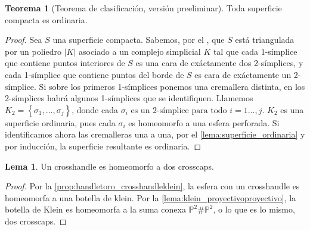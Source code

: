 \documentclass[10pt]{report}
\newcommand{\Proyectivo}{\mathbb{P}^2}
\theoremstyle{definition}
\newtheorem{tma}[defin]{Teorema}
\newtheorem{lema}[defin]{Lema}
\begin{document}
\begin{tma}[Teorema de clasificación, versión preeliminar] %
Toda superficie compacta es ordinaria.
\end{tma}
\begin{proof}
Sea $S$ una superficie compacta. Sabemos, por el , que $S$ está triangulada por un poliedro $|K|$ asociado a un complejo simplicial $K$ tal que cada 1-símplice que contiene puntos interiores de $S$ es una cara de exáctamente dos 2-símplices, y cada 1-símplice que contiene puntos del borde de $S$ es cara de exáctamente un 2-símplice. Si sobre los primeros 1-símplices ponemos una cremallera distinta, en los 2-símplices habrá algunos 1-símplices que se identifiquen. Llamemos $K_2=\left\{\sigma_1,\dots ,\sigma_j\right\}$, donde cada $\sigma_i \text{ es un 2-símplice para todo } i=1\dots ,j$. $K_2$ es una superficie ordinaria, pues cada $\sigma_i$ es homeomorfo a una esfera perforada. Si identificamos ahora las cremalleras una a una, por el \autoref{lema:superficie_ordinaria} y por inducción, la superficie resultante es ordinaria.
\end{proof}


\begin{lema}\label{lema:1}
Un crosshandle es homeomorfo a dos crosscaps.
\end{lema}
\begin{proof}
Por la \autoref{prop:handletoro_crosshandleklein}, la esfera con un crosshandle es homeomorfa a una botella de klein. Por la \autoref{lema:klein_proyectivoproyectivo}, la botella de Klein es homeomorfa a la suma conexa $\Proyectivo \# \Proyectivo$, o lo que es lo mismo, dos crosscaps.
\end{proof}
\end{document}
